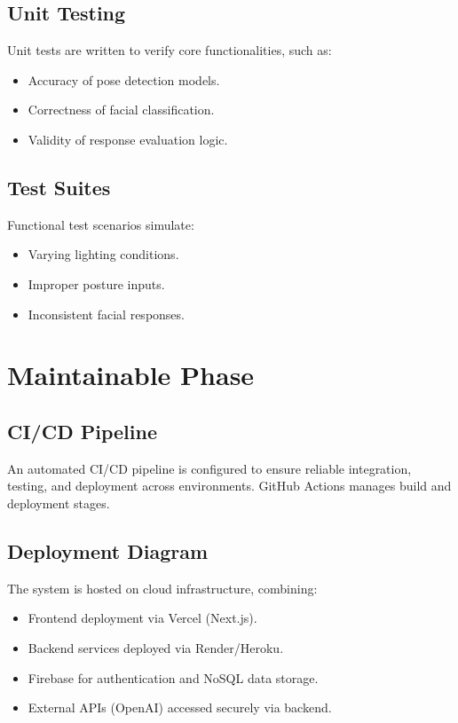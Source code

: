\subsection{Unit Testing}
Unit tests are written to verify core functionalities, such as:

\begin{itemize}
  \item Accuracy of pose detection models.
  \item Correctness of facial classification.
  \item Validity of response evaluation logic.
\end{itemize}

\subsection{Test Suites}
Functional test scenarios simulate:

\begin{itemize}
  \item Varying lighting conditions.
  \item Improper posture inputs.
  \item Inconsistent facial responses.
\end{itemize}

\section{Maintainable Phase}

\subsection{CI/CD Pipeline}
An automated CI/CD pipeline is configured to ensure reliable integration, testing, and deployment across environments. GitHub Actions manages build and deployment stages.

\subsection{Deployment Diagram}
The system is hosted on cloud infrastructure, combining:

\begin{itemize}
  \item Frontend deployment via Vercel (Next.js).
  \item Backend services deployed via Render/Heroku.
  \item Firebase for authentication and NoSQL data storage.
  \item External APIs (OpenAI) accessed securely via backend.
\end{itemize}


